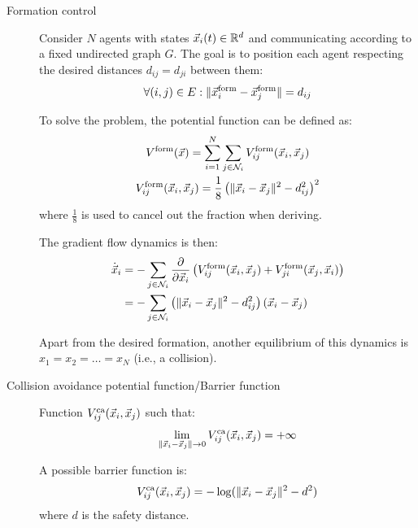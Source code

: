 \begin{description}
    \item[Formation control] 
        Consider $N$ agents with states ${\vec{x}}_i(t) \in \mathbb{R}^d$ and communicating according to a fixed undirected graph $G$. The goal is to position each agent respecting the desired distances $d_{ij} = d_{ji}$ between them:
        \[
            \forall (i,j) \in E: \Vert {\vec{x}}_i^\text{form} - {\vec{x}}_j^\text{form} \Vert = d_{ij}
        \]

        To solve the problem, the potential function can be defined as:
        \[
            \begin{gathered}
                V^\text{form}({\vec{x}}) = \sum_{i=1}^{N} \sum_{j \in \mathcal{N}_i} V_{ij}^\text{form}({\vec{x}}_i, {\vec{x}}_j) \\
                V_{ij}^\text{form}({\vec{x}}_i, {\vec{x}}_j) = \frac{1}{8} \left( \Vert {\vec{x}}_i - {\vec{x}}_j \Vert^2 - d_{ij}^2 \right)^2
            \end{gathered}
        \]
        where $\frac{1}{8}$ is used to cancel out the fraction when deriving.

        The gradient flow dynamics is then:
        \[
            \begin{split}
                \dot{{\vec{x}}}_i &= - \sum_{j \in \mathcal{N}_i} \frac{\partial}{\partial {\vec{x}}_i} \left( V_{ij}^\text{form}({\vec{x}}_i, {\vec{x}}_j) + V_{ji}^\text{form}({\vec{x}}_j, {\vec{x}}_i) \right) \\
                &= - \sum_{j \in \mathcal{N}_i} \left( \Vert {\vec{x}}_i - {\vec{x}}_j \Vert^2 - d_{ij}^2 \right)({\vec{x}}_i - {\vec{x}}_j)
            \end{split}
        \]

        \begin{remark}
            Apart from the desired formation, another equilibrium of this dynamics is $x_1 = x_2 = \dots = x_N$ (i.e., a collision).
        \end{remark}

    \item[Collision avoidance potential function/Barrier function] 
        Function $V_{ij}^\text{ca}({\vec{x}}_i, {\vec{x}}_j)$ such that:
        \[
            \lim_{\Vert {\vec{x}}_i - {\vec{x}}_j \Vert \rightarrow 0} V_{ij}^\text{ca}({\vec{x}}_i, {\vec{x}}_j) = +\infty
        \]

        \begin{remark}
            A possible barrier function is:
            \[
                V_{ij}^\text{ca}({\vec{x}}_i, {\vec{x}}_j) = - \log( \Vert {\vec{x}}_i - {\vec{x}}_j \Vert^2 - d^2 )
            \]
            where $d$ is the safety distance.
        \end{remark}


\end{description}
